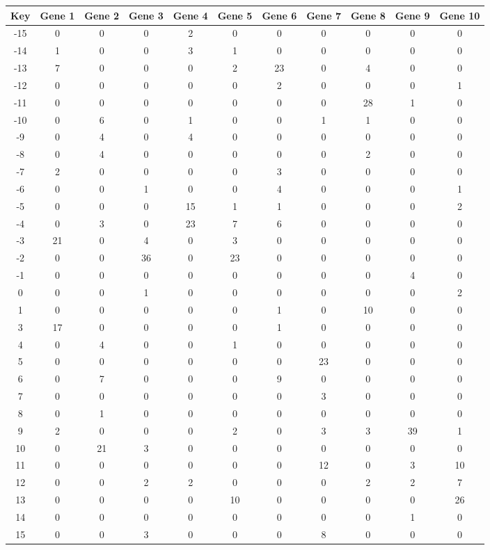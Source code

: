 \begin{tabular}{|c|c|c|c|c|c|c|c|c|c|c|}
\hline
Key & Gene 1 & Gene 2 & Gene 3 & Gene 4 & Gene 5 & Gene 6 & Gene 7 & Gene 8 & Gene 9 & Gene 10 \\
\hline
-15 & 0 & 0 & 0 & 2 & 0 & 0 & 0 & 0 & 0 & 0 \\
-14 & 1 & 0 & 0 & 3 & 1 & 0 & 0 & 0 & 0 & 0 \\
-13 & 7 & 0 & 0 & 0 & 2 & 23 & 0 & 4 & 0 & 0 \\
-12 & 0 & 0 & 0 & 0 & 0 & 2 & 0 & 0 & 0 & 1 \\
-11 & 0 & 0 & 0 & 0 & 0 & 0 & 0 & 28 & 1 & 0 \\
-10 & 0 & 6 & 0 & 1 & 0 & 0 & 1 & 1 & 0 & 0 \\
-9 & 0 & 4 & 0 & 4 & 0 & 0 & 0 & 0 & 0 & 0 \\
-8 & 0 & 4 & 0 & 0 & 0 & 0 & 0 & 2 & 0 & 0 \\
-7 & 2 & 0 & 0 & 0 & 0 & 3 & 0 & 0 & 0 & 0 \\
-6 & 0 & 0 & 1 & 0 & 0 & 4 & 0 & 0 & 0 & 1 \\
-5 & 0 & 0 & 0 & 15 & 1 & 1 & 0 & 0 & 0 & 2 \\
-4 & 0 & 3 & 0 & 23 & 7 & 6 & 0 & 0 & 0 & 0 \\
-3 & 21 & 0 & 4 & 0 & 3 & 0 & 0 & 0 & 0 & 0 \\
-2 & 0 & 0 & 36 & 0 & 23 & 0 & 0 & 0 & 0 & 0 \\
-1 & 0 & 0 & 0 & 0 & 0 & 0 & 0 & 0 & 4 & 0 \\
0 & 0 & 0 & 1 & 0 & 0 & 0 & 0 & 0 & 0 & 2 \\
1 & 0 & 0 & 0 & 0 & 0 & 1 & 0 & 10 & 0 & 0 \\
3 & 17 & 0 & 0 & 0 & 0 & 1 & 0 & 0 & 0 & 0 \\
4 & 0 & 4 & 0 & 0 & 1 & 0 & 0 & 0 & 0 & 0 \\
5 & 0 & 0 & 0 & 0 & 0 & 0 & 23 & 0 & 0 & 0 \\
6 & 0 & 7 & 0 & 0 & 0 & 9 & 0 & 0 & 0 & 0 \\
7 & 0 & 0 & 0 & 0 & 0 & 0 & 3 & 0 & 0 & 0 \\
8 & 0 & 1 & 0 & 0 & 0 & 0 & 0 & 0 & 0 & 0 \\
9 & 2 & 0 & 0 & 0 & 2 & 0 & 3 & 3 & 39 & 1 \\
10 & 0 & 21 & 3 & 0 & 0 & 0 & 0 & 0 & 0 & 0 \\
11 & 0 & 0 & 0 & 0 & 0 & 0 & 12 & 0 & 3 & 10 \\
12 & 0 & 0 & 2 & 2 & 0 & 0 & 0 & 2 & 2 & 7 \\
13 & 0 & 0 & 0 & 0 & 10 & 0 & 0 & 0 & 0 & 26 \\
14 & 0 & 0 & 0 & 0 & 0 & 0 & 0 & 0 & 1 & 0 \\
15 & 0 & 0 & 3 & 0 & 0 & 0 & 8 & 0 & 0 & 0 \\
\hline
\end{tabular}